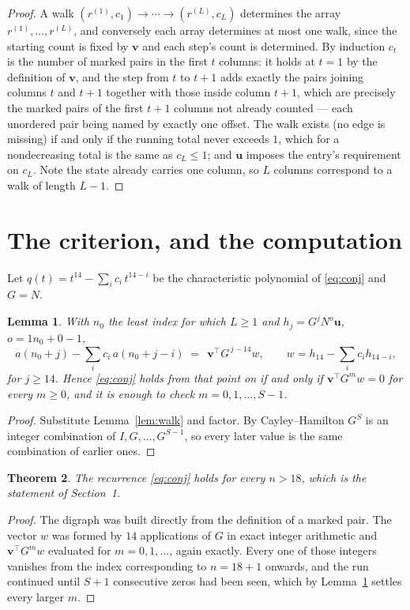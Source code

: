 \documentclass[11pt,a4paper]{article}
\theoremstyle{plain}
\newtheorem{theorem}{Theorem}
\newtheorem{lemma}[theorem]{Lemma}
\theoremstyle{definition}
\begin{document}
\begin{proof}
A walk $(r^{(1)},c_1)\to\cdots\to(r^{(L)},c_L)$ determines the array
$r^{(1)},\dots,r^{(L)}$, and conversely each array determines at most one walk, since the
starting count is fixed by $\mathbf{v}$ and each step's count is determined. By induction
$c_t$ is the number of marked pairs in the first $t$ columns: it holds at $t=1$ by the
definition of $\mathbf{v}$, and the step from $t$ to $t+1$ adds exactly the pairs joining
columns $t$ and $t+1$ together with those inside column $t+1$, which are precisely the marked
pairs of the first $t+1$ columns not already counted --- each unordered pair being named by
exactly one offset. The walk exists (no edge is missing) if and only if the running total
never exceeds $1$, which for a nondecreasing total is the same as $c_L\le1$; and
$\mathbf{u}$ imposes the entry's requirement on $c_L$. Note the state already carries one
column, so $L$ columns correspond to a walk of length $L-1$.
\end{proof}

\section{The criterion, and the computation}

Let $q(t)=t^{14}-\sum_i c_i\,t^{14-i}$ be the characteristic polynomial of
\eqref{eq:conj} and $G=N$.

\begin{lemma}\label{lem:crit}
With $n_0$ the least index for which $L\ge1$ and $h_j=G^{j}N^{o}\mathbf{u}$,
$o=1n_0+0-1$,
\[
a(n_0+j)-\sum_i c_i\,a(n_0+j-i)\;=\;\,\mathbf{v}^{\!\top}G^{\,j-14}w,
\qquad w=h_{14}-\sum_i c_i h_{14-i},
\]
for $j\ge14$. Hence \eqref{eq:conj} holds from that point on if and only if
$\mathbf{v}^{\!\top}G^{m}w=0$ for every $m\ge0$, and it is enough to check
$m=0,1,\dots,S-1$.
\end{lemma}

\begin{proof}
Substitute Lemma~\ref{lem:walk} and factor. By Cayley--Hamilton $G^{S}$ is an integer
combination of $I,G,\dots,G^{S-1}$, so every later value is the same combination of earlier
ones.
\end{proof}

\begin{theorem}
The recurrence \eqref{eq:conj} holds for every $n>18$, which is the statement of
Section~1.
\end{theorem}

\begin{proof}
The digraph was built directly from the definition of a marked pair. The vector $w$ was
formed by $14$ applications of $G$ in exact integer arithmetic and
$\mathbf{v}^{\!\top}G^{m}w$ evaluated for $m=0,1,\dots$, again exactly. Every one of
those integers vanishes from the index corresponding to $n=18+1$ onwards, and the run
continued until $S+1$ consecutive zeros had been seen, which by Lemma~\ref{lem:crit}
settles every larger $m$.
\end{proof}
\end{document}
